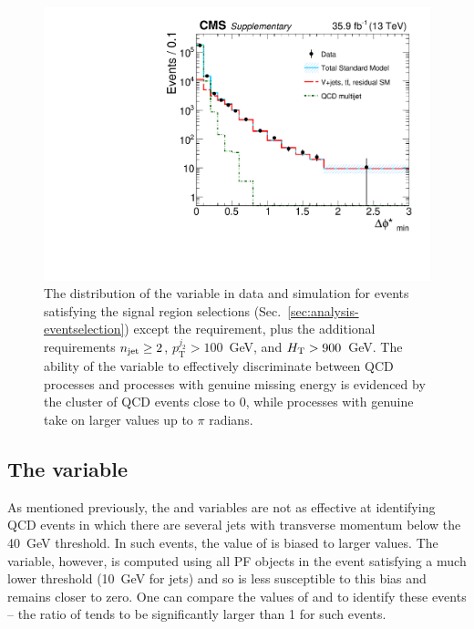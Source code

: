 
\begin{figure}[t!]
\begin{center}
\includegraphics[width=0.7\linewidth]{figs/analysis/propaganda_bdphi_180210}
\caption{The distribution of the \bdphi variable in data and simulation for 
events satisfying the signal region selections 
(Sec.~\ref{sec:analysis-eventselection}) except the \bdphi requirement, plus 
the additional requirements $n_{\text{jet}} \geq 2$, $p_{\mathrm{T}}^{j_2} > 
100$~GeV, and $\mbox{$H_\text{T}$} > 900$~GeV. The 
ability 
of the variable to effectively discriminate between QCD processes and processes 
with genuine missing energy is evidenced by the cluster of QCD events close to 
0, while processes with genuine \met take on larger values up to $\pi$ radians.}
\label{fig:bdphi}
\end{center}
\end{figure}

\subsection{The \mhtmet variable}

As mentioned previously, the \alphat and \bdphi variables are not as effective 
at identifying QCD events in which there are several jets with transverse 
momentum below the 40~GeV threshold. In such events, the value of \mht is 
biased to larger values. The \met variable, however, is computed using all PF 
objects in the event satisfying a much lower threshold (10~GeV for jets) 
and so is less susceptible to this bias and remains 
closer to zero. One can compare the values of \mht and \met to identify these 
events -- the ratio of \mhtmet tends to be significantly larger than 1 for such 
events. 

